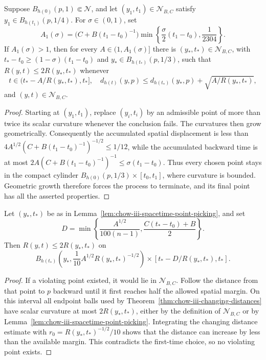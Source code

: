 \begin{lemma}
\label{lem:chow-iii-spacetime-point-picking}
Suppose \(B_{h(0)}(p,1)\Subset\mathcal N\), and let
\((y_1,t_1)\in\mathcal N_{B,C}\) satisfy
\(y_1\in B_{h(t_1)}(p,1/4)\).  For \(\sigma\in(0,1)\), set
\[
 A_1(\sigma)=\bigl(C+B(t_1-t_0)^{-1}\bigr)
 \min\left\{\frac\sigma2(t_1-t_0),\frac1{2304}\right\}.
\]
If \(A_1(\sigma)>1\), then for every \(A\in(1,A_1(\sigma)]\) there is
\((y_*,t_*)\in\mathcal N_{B,C}\), with
\(t_*-t_0\ge(1-\sigma)(t_1-t_0)\) and
\(y_*\in B_{h(t_*)}(p,1/3)\), such that \(R(y,t)\le2R(y_*,t_*)\) whenever
\[
 t\in(t_*-A/R(y_*,t_*),t_*],
 \quad d_{h(t)}(y,p)\le d_{h(t_*)}(y_*,p)+\sqrt{A/R(y_*,t_*)},
\]
and \((y,t)\in\mathcal N_{B,C}\).
\end{lemma}
\begin{proof}
Starting at \((y_1,t_1)\), replace \((y_i,t_i)\) by an admissible point of
more than twice its scalar curvature whenever the conclusion fails.  The
curvatures then grow geometrically.  Consequently the accumulated spatial
displacement is less than
\(4A^{1/2}(C+B(t_1-t_0)^{-1})^{-1/2}\le1/12\), while the accumulated backward
time is at most \(2A(C+B(t_1-t_0)^{-1})^{-1}\le\sigma(t_1-t_0)\).  Thus every
chosen point stays in the compact cylinder
\(B_{h(0)}(p,1/3)\times[t_0,t_1]\), where curvature is bounded.  Geometric
growth therefore forces the process to terminate, and its final point has all
the asserted properties.
\end{proof}

\begin{proposition}
\label{prop:chow-iii-parabolic-cylinder-curvature-control}
Let \((y_*,t_*)\) be as in
Lemma~\ref{lem:chow-iii-spacetime-point-picking}, and set
\[
 D=\min\left\{\frac{A^{1/2}}{100(n-1)},
 \frac{C(t_*-t_0)+B}{2}\right\}.
\]
Then \(R(y,t)\le2R(y_*,t_*)\) on
\[
 B_{h(t_*)}\left(y_*,\frac1{10}A^{1/2}R(y_*,t_*)^{-1/2}\right)
 \times[t_*-D/R(y_*,t_*),t_*].
\]
\end{proposition}
\begin{proof}
If a violating point existed, it would lie in \(\mathcal N_{B,C}\).  Follow
the distance from that point to \(p\) backward until it first reaches half the
allowed spatial margin.  On this interval all endpoint balls used by
Theorem~\ref{thm:chow-iii-changing-distances} have scalar curvature at most
\(2R(y_*,t_*)\), either by the definition of \(\mathcal N_{B,C}\) or by
Lemma~\ref{lem:chow-iii-spacetime-point-picking}.  Integrating the changing
distance estimate with \(r_0=R(y_*,t_*)^{-1/2}/10\) shows that the distance can
increase by less than the available margin.  This contradicts the first-time
choice, so no violating point exists.
\end{proof}


